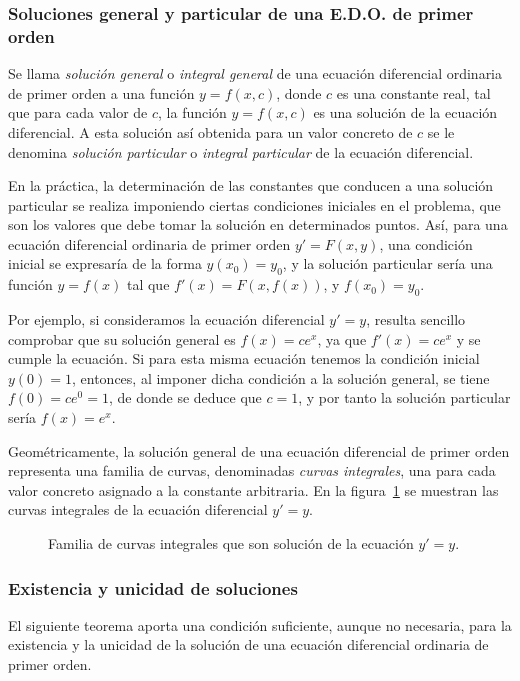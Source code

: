 \subsubsection*{Soluciones general y particular de una E.D.O. de primer orden}
Se llama \emph{solución general} o \emph{integral general} de una ecuación diferencial ordinaria de primer orden a una
función $y=f(x,c)$, donde $c$ es una constante real, tal que para cada valor de $c$, la función $y=f(x,c)$ es una
solución de la ecuación diferencial. 
A esta solución así obtenida para un valor concreto de $c$ se le denomina \emph{solución particular} o \emph{integral
particular} de la ecuación diferencial.

En la práctica, la determinación de las constantes que conducen a una solución particular se realiza imponiendo ciertas
condiciones iniciales en el problema, que son los valores que debe tomar la solución en determinados puntos. 
Así, para una ecuación diferencial ordinaria de primer orden $y'=F(x,y)$, una condición inicial se expresaría de la
forma $y(x_{0})=y_{0}$, y la solución particular sería una función $y=f(x)$ tal que $f'(x)=F(x,f(x))$, y $f(x_0)=y_0$.

Por ejemplo, si consideramos la ecuación diferencial $y'=y$, resulta sencillo comprobar que su solución general es
$f(x)=ce^x$, ya que $f'(x)=ce^x$ y se cumple la ecuación. 
Si para esta misma ecuación tenemos la condición inicial $y(0)=1$, entonces, al imponer dicha condición a la solución
general, se tiene $f(0)=ce^0=1$, de donde se deduce que $c=1$, y por tanto la solución particular sería $f(x)=e^x$.

Geométricamente, la solución general de una ecuación diferencial de primer orden representa una familia de curvas,
denominadas \emph{curvas integrales}, una para cada valor concreto asignado a la constante arbitraria. 
En la figura~\ref{g:curvas integrales} se muestran las curvas integrales de la ecuación diferencial $y'=y$.

\begin{figure}[h!]
\begin{center}
\scalebox{1}{}
\caption{Familia de curvas integrales que son solución de la ecuación $y'=y$.}
\label{g:curvas integrales}
\end{center}
\end{figure}

\subsubsection*{Existencia y unicidad de soluciones}
El siguiente teorema aporta una condición suficiente, aunque no necesaria, para la existencia y la unicidad de la
solución de una ecuación diferencial ordinaria de primer orden.

